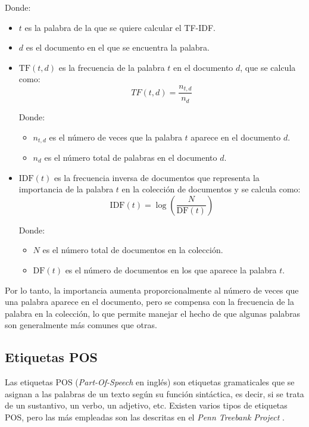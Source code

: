Donde:
\begin{itemize}
	\item $t$ es la palabra de la que se quiere calcular el TF-IDF.
	\item $d$ es el documento en el que se encuentra la palabra.
	\item $\text{TF}(t,d)$ es la frecuencia de la palabra $t$ en el documento $d$, que se calcula como:
		\begin{equation}
				\label{eq:tf}
				TF(t,d) = \frac{n_{t,d}}{n_d}
		\end{equation}

		Donde:
		\begin{itemize}
				\item $n_{t,d}$ es el número de veces que la palabra $t$ aparece en el documento $d$.
				\item $n_d$ es el número total de palabras en el documento $d$.
		\end{itemize}

	\item $\text{IDF}(t)$ es la frecuencia inversa de documentos que representa la importancia de la palabra $t$ en la colección de documentos y
		se calcula como:
		\begin{equation}
			\label{eq:idf}
			\text{IDF}(t) = \log \left(\frac{N}{\text{DF}(t)}\right)
		\end{equation}

		Donde:
		\begin{itemize}
				\item $N$ es el número total de documentos en la colección.
				\item $\text{DF}(t)$ es el número de documentos en los que aparece la palabra $t$.
		\end{itemize}
\end{itemize}

\bigskip
Por lo tanto, la importancia aumenta proporcionalmente al número de veces que una palabra aparece en el documento, pero se compensa con la frecuencia 
de la palabra en la colección, lo que permite manejar el hecho de que algunas palabras son generalmente más comunes que otras.

\subsection{Etiquetas POS}

Las etiquetas POS (\textit{Part-Of-Speech} en inglés) son etiquetas gramaticales que se asignan a las palabras de un texto según su función sintáctica, es
decir, si se trata de un sustantivo, un verbo, un adjetivo, etc.
Existen varios tipos de etiquetas POS, pero las más empleadas son las descritas en el \textit{Penn Treebank Project} \cite{marcus1993building}.

